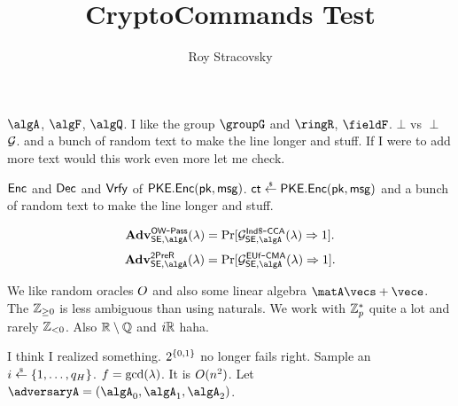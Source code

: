 \documentclass[11pt, oneside]{article}
\title{CryptoCommands Test}
\author{Roy Stracovsky}
\begin{document}
\maketitle

$\algA$, $\algF$, $\algQ$. I like the group $\groupG$ and $\ringR$, $\fieldF$. $\bot$ vs $\perp$
$\mathcal{G}$. and a bunch of random text to make the line longer and stuff. If I were to add more text would this work even more let me check.

$\mathsf{Enc}$ and $\mathsf{Dec}$ and $\mathsf{Vrfy}$ of $\mathsf{PKE}.\mathsf{Enc}(\mathsf{pk}, \mathsf{msg})$.
$\ct \sample \PKEncScheme.\PKEnc(\pk, \msg)$ and a bunch of random text to make the line longer and stuff.

$$ \Adv{\OWPass}{\SEncScheme, \algA}{\secpar} = \Pr[\game^\IndRCCA_{\SEncScheme, \algA}(\secpar) \outputs 1].$$
$$ \Adv{\SecPreimageRes}{\SEncScheme, \algA}{\secpar} = \Pr[\game^\EUfCMA_{\SEncScheme, \algA}(\secpar) \outputs 1].$$

We like random oracles $O$ and also some linear algebra $\matA\vecs + \vece$. The ${\mathbb{Z}_{\ge 0}}$ is less ambiguous than using naturals.
We work with ${\mathbb{Z}^\ast_{p}}$ quite a lot and rarely ${\mathbb{Z}_{< 0}}$. Also ${\mathbb{R} \setminus \mathbb{Q}}$ and ${i\mathbb{R}}$ haha.

I think I realized something. $2^{\{0, 1\}}$ no longer fails right.
Sample an $i \sample \Range{1}{q_H}$. $f = \gcd(\lambda)$. It is $O(n^2)$.
Let $\adversaryA = (\algA_0, \algA_1, \algA_2)$.

  
\end{document}
